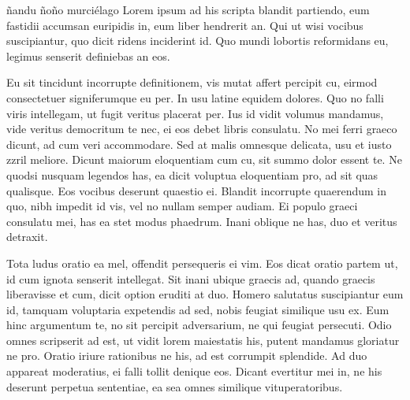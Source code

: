 \documentclass{memoria}
\begin{document}


\indices



ñandu ñoño murciélago Lorem ipsum ad his scripta blandit partiendo, eum fastidii accumsan euripidis
in, eum liber hendrerit an. Qui ut wisi vocibus suscipiantur, quo dicit ridens
inciderint id. Quo mundi lobortis reformidans eu, legimus senserit definiebas an
eos. 

Eu sit tincidunt incorrupte definitionem, vis mutat affert percipit cu,
eirmod consectetuer signiferumque eu per. In usu latine equidem dolores. Quo no
falli viris intellegam, ut fugit veritus placerat per. Ius id vidit volumus
mandamus, vide veritus democritum te nec, ei eos debet libris consulatu. No mei
ferri graeco dicunt, ad cum veri accommodare. Sed at malis omnesque delicata,
usu et iusto zzril meliore. Dicunt maiorum eloquentiam cum cu, sit summo dolor
essent te. Ne quodsi nusquam legendos has, ea dicit voluptua eloquentiam pro, ad
sit quas qualisque. Eos vocibus deserunt quaestio ei. Blandit incorrupte
quaerendum in quo, nibh impedit id vis, vel no nullam semper audiam. Ei populo
graeci consulatu mei, has ea stet modus phaedrum. Inani oblique ne has, duo et
veritus detraxit. 



Tota ludus oratio ea mel, offendit persequeris ei vim. Eos
dicat oratio partem ut, id cum ignota senserit intellegat. Sit inani ubique
graecis ad, quando graecis liberavisse et cum, dicit option eruditi at duo.
Homero salutatus suscipiantur eum id, tamquam voluptaria expetendis ad sed,
nobis feugiat similique usu ex. Eum hinc argumentum te, no sit percipit
adversarium, ne qui feugiat persecuti. Odio omnes scripserit ad est, ut vidit
lorem maiestatis his, putent mandamus gloriatur ne pro. Oratio iriure rationibus
ne his, ad est corrumpit splendide. Ad duo appareat moderatius, ei falli tollit
denique eos. Dicant evertitur mei in, ne his deserunt perpetua sententiae, ea
sea omnes similique vituperatoribus. 


\end{document}
